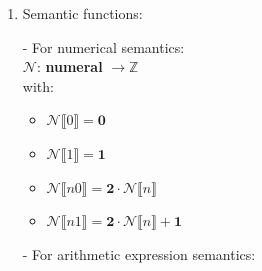 \documentclass{article}
\begin{document}
\begin{enumerate}


\item Semantic functions:

    - For numerical semantics:\\
    
        $\mathscr{N}$: \textbf{numeral} $\rightarrow \mathbb{Z}$\\
        with:
        \begin{itemize}
            \item $\mathscr{N}\llbracket0\rrbracket = \textbf{0}$
            \item $\mathscr{N}\llbracket1\rrbracket = \textbf{1}$
            \item $\mathscr{N}\llbracket n 0\rrbracket = \textbf{2} \cdot \mathscr{N}\llbracket n\rrbracket$
            \item $\mathscr{N}\llbracket n 1\rrbracket = \textbf{2} \cdot \mathscr{N}\llbracket n\rrbracket + \textbf{1}$
        \end{itemize}

        

    - For arithmetic expression semantics:\\
    

\end{enumerate}
\end{document}
